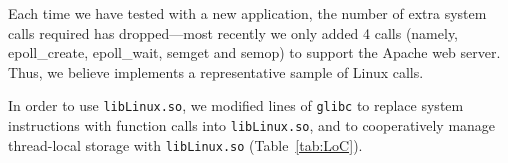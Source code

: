 Each time we have tested \sysname{} with a new application, the number of extra system calls
required has dropped---most recently we only added 4 calls
(namely, epoll\_create, epoll\_wait, semget and semop)
to support the Apache web server.
Thus, we believe \sysname{} implements a representative sample of Linux calls.



\begin{comment}
Most {\tt libLinux.so} code reimplements
Linux kernel functionality.  We found it expedient to 
read the Linux source in order to understand its behavior and then reimplement 
that behavior on the \pal{} ABI in most cases.
In some cases, such as the file caching code,
we refactored code directly from the Linux kernel.
\end{comment}

In order to use {\tt libLinux.so}, we modified \libclines{} lines of {\tt glibc} to replace 
system instructions with function calls into {\tt lib\-Linux.so},
and to cooperatively manage thread-local storage with {\tt libLinux.so} (Table~\ref{tab:LoC}).




\begin{comment}
\vspace{5pt}
\noindent{\bf ABI Extensions.~}
\sysname{} extends the Drawbridge ABI with 9 additional \pal{} calls.
As discussed above, one creates a new sandbox, and 
5 additional calls were added for IPC.
We also add 3 calls to manage x86 segmentation registers
and exceptions (Bascule~\citep{baumann13bascule} adds
similar extensions).
\end{comment}

